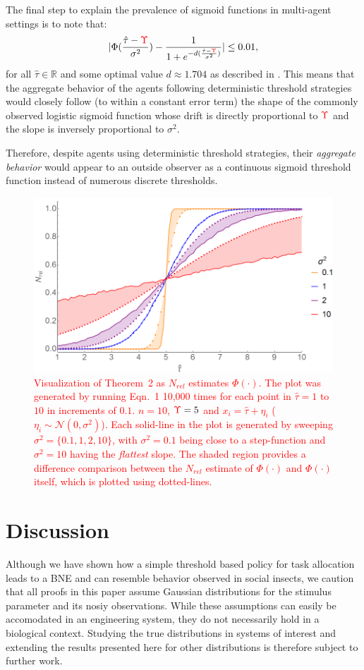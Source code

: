 \documentclass[smallextended]{svjour3}       %
\newcommand{\edit}[1]{\textcolor{red}{#1}}
\def\R{\mathbb{R}}    %
\def\td{\edit{\Upsilon}}   %
\begin{document}
The final step to explain the prevalence of sigmoid functions in multi-agent settings is to note that:
\begin{align*}
|\Phi(\frac{\hat{\tau}-\td}{\sigma^2})-\frac{1}{1+e^{-d(\frac{\hat{\tau}-\td}{\sigma^2})}}|\leq 0.01,
\end{align*}
for all $\hat{\tau}\in\R$ and some optimal value $d\approx 1.704$ as described in \citep{Camilli1994}. This means that the aggregate behavior of the agents following deterministic threshold strategies would closely follow (to within a constant error term) the shape of the commonly observed logistic sigmoid function whose drift is directly proportional to $\td$ and the slope is inversely proportional to $\sigma^2$. 

Therefore, despite agents using deterministic threshold strategies, their \emph{aggregate behavior} would appear to an outside observer as a continuous sigmoid threshold function instead of numerous discrete thresholds.
\begin{figure}[!ht]
	\centering\includegraphics[width=0.6\columnwidth]{figures/thm2fig.png}
	\centering\caption{\edit{Visualization of Theorem~2 as $N_{rel}$ estimates $\Phi(\cdot)$. The plot was generated by running Eqn.~1 10,000 times for each point in $\hat{\tau} = 1$ to $10$ in increments of $0.1$. $n = 10$, $\td = 5$ and $x_i = \hat{\tau} + \eta_i$ ($\eta_i \sim\mathcal{N}(0, \sigma^2)$). Each solid-line in the plot is generated by sweeping $\sigma^2 = \{0.1, 1, 2, 10\}$, with $\sigma^2 = 0.1$ being close to a step-function and $\sigma^2 = 10$ having the \emph{flattest} slope. The shaded region provides a difference comparison between the $N_{rel}$ estimate of $\Phi(\cdot)$ and $\Phi(\cdot)$ itself, which is plotted using dotted-lines.}}\label{fig:thm2fig}
\end{figure}

\section{Discussion}
Although we have shown how a simple threshold based policy for task allocation leads to a BNE and can resemble behavior observed in social insects, we caution that all proofs in this paper assume Gaussian distributions for the stimulus parameter and its nosiy observations. While these assumptions can easily be accomodated in an engineering system, they do not necessarily hold in a biological context. Studying the true distributions in systems of interest and extending the results presented here for other distributions is therefore subject to further work.
\end{document}
